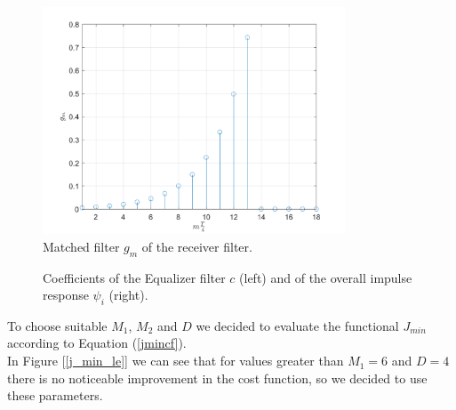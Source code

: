 \documentclass[a4paper, 12pt]{report}
\begin{document}
\begin{figure}[H]
	\centering
	\includegraphics[width=9cm]{images/RecA_gm}
	\caption{Matched filter $g_m$ of the receiver filter.}\label{gm_a}
\end{figure}

\begin{figure}[H]
	\centering
	\caption{Coefficients of the Equalizer filter $c$ (left) and of the overall impulse response $\psi_i$ (right).}\label{filters_a}
\end{figure}

To choose suitable $M_1$, $M_2$ and $D$ we decided to evaluate the functional $J_{min}$ according to Equation (\ref{jmincf}).\\
In Figure [\ref{j_min_le}] we can see that for values greater than $M_1=6$ and $D=4$ there is no noticeable improvement in the cost function, so we decided to use these parameters.
\end{document}
